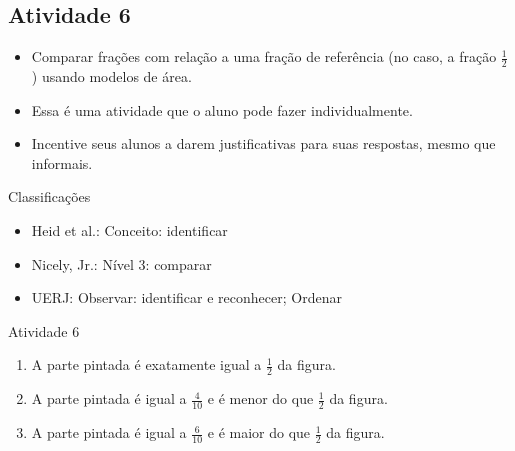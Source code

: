 \documentclass[oneside]{book}
\begin{document}
\begin{multicols}{2}
\subsection{Atividade 6}

  \vspace{.1cm}
  
\begin{itemize} %
    \item       Comparar frações com relação a uma fração de referência (no caso, a fração       $\frac{1}{2}$      ) usando modelos de área.
\end{itemize} %


  \vspace{.1cm} 
  
  \vspace{.1cm}

  \begin{itemize} %
    \item       Essa é uma atividade que o aluno pode fazer individualmente.
    \item       Incentive seus alunos a darem justificativas para suas respostas, mesmo que informais.
\end{itemize} %


  Classificações
\begin{itemize} %
    \item       Heid et al.: Conceito: identificar
    \item       Nicely, Jr.: Nível 3: comparar
    \item       UERJ: Observar: identificar e reconhecer; Ordenar
\end{itemize} %

\begin{resposta*}{Atividade 6}
\begin{enumerate} [\quad a)] %
    \item       A parte pintada é exatamente igual a       $\frac{1}{2}$       da figura.
    \item       A parte pintada é igual a       $\frac{4}{10}$       e é menor do que       $\frac{1}{2}$       da figura.
    \item       A parte pintada é igual a       $\frac{6}{10}$       e é maior do que       $\frac{1}{2}$       da figura.
\end{enumerate} %

\end{resposta*}


\end{multicols}
\end{document}
